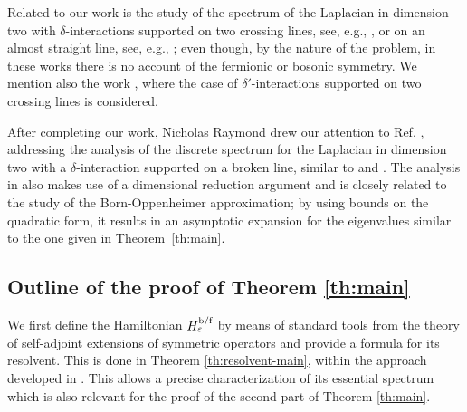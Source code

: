 \documentclass[a4paper,11pt,reqno]{amsart}
\theoremstyle{definition}
\numberwithin{equation}{section}
\newcommand{\ve}{\varepsilon}
\newcommand{\bof}{\text{\rm b/f}}
\begin{document}
Related to our work is the study of the spectrum of the  Laplacian in dimension two with   $\delta$-interactions supported on two crossing lines, see, e.g.,  \cite{ExnerNemcova03}, or on an almost straight line, see, e.g.,     \cite{ExnerIchinose01}; even though,  by the nature of the problem, in these works there is no account of the fermionic or bosonic symmetry. We mention also the work \cite{PankrashkinVogel22}, where the case of $\delta'$-interactions supported on two crossing lines is considered. 


After completing  our work, Nicholas Raymond drew our attention  to Ref. \cite{DucheneRaymond14}, addressing the analysis of the  discrete spectrum for the Laplacian in dimension two with a  $\delta$-interaction supported on a broken line, similar to  \cite{ExnerIchinose01} and \cite{ExnerNemcova03}.  The analysis in \cite{DucheneRaymond14} also makes use of a dimensional reduction argument and is closely related to the study of the Born-Oppenheimer approximation; by using bounds on the quadratic form, it results in an asymptotic expansion for the eigenvalues similar to the one given in Theorem~\ref{th:main}. 

\subsection*{Outline of the proof of Theorem \ref{th:main}}
We first define the Hamiltonian $H^{\bof}_\ve$ by means of standard tools from the theory of self-adjoint extensions of symmetric operators  and provide a formula for its  resolvent. This is done in Theorem \ref{th:resolvent-main}, within the approach developed in \cite{Pjfa01}. This allows a precise characterization of its essential spectrum which is also relevant for the proof of the second part of Theorem  \ref{th:main}.
\end{document}
